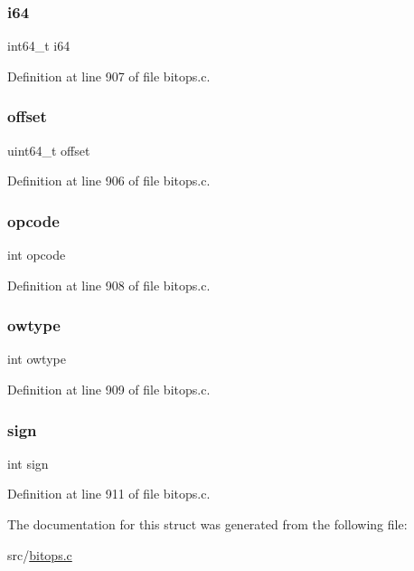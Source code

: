 \subsubsection{\texorpdfstring{i64}{i64}}
{\footnotesize\ttfamily int64\+\_\+t i64}



Definition at line 907 of file bitops.\+c.

\mbox{\label{structbitfield_op_a612bb2807d848cca89ea1437cceea886}} 
\subsubsection{\texorpdfstring{offset}{offset}}
{\footnotesize\ttfamily uint64\+\_\+t offset}



Definition at line 906 of file bitops.\+c.

\mbox{\label{structbitfield_op_aff3af4fae5174de7c7e40ec004999ca0}} 
\subsubsection{\texorpdfstring{opcode}{opcode}}
{\footnotesize\ttfamily int opcode}



Definition at line 908 of file bitops.\+c.

\mbox{\label{structbitfield_op_a9ed5a15ccd67f24e83836aa6b0830fd8}} 
\subsubsection{\texorpdfstring{owtype}{owtype}}
{\footnotesize\ttfamily int owtype}



Definition at line 909 of file bitops.\+c.

\mbox{\label{structbitfield_op_abbeb8ae63622a7fef0b5a56bb91a1682}} 
\subsubsection{\texorpdfstring{sign}{sign}}
{\footnotesize\ttfamily int sign}



Definition at line 911 of file bitops.\+c.



The documentation for this struct was generated from the following file\+:\begin{DoxyCompactItemize}
\item 
src/\hyperlink{bitops_8c}{bitops.\+c}\end{DoxyCompactItemize}
